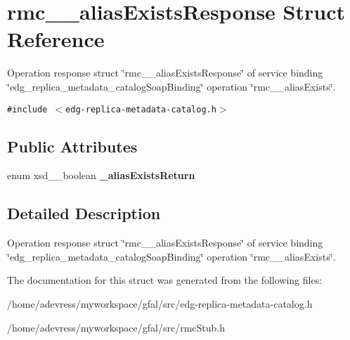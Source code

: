 \section{rmc\_\-\_\-alias\-Exists\-Response Struct Reference}
\label{structrmc____aliasExistsResponse}
Operation response struct \char`\"{}rmc\_\-\_\-alias\-Exists\-Response\char`\"{} of service binding \char`\"{}edg\_\-replica\_\-metadata\_\-catalog\-Soap\-Binding\char`\"{} operation \char`\"{}rmc\_\-\_\-alias\-Exists\char`\"{}.  


{\tt \#include $<$edg-replica-metadata-catalog.h$>$}

\subsection*{Public Attributes}
\begin{CompactItemize}
\item 
enum xsd\_\-\_\-boolean \textbf{\_\-alias\-Exists\-Return}\label{structrmc____aliasExistsResponse_06918aeebfd1263a8fa5eb0db5ab43c6}

\end{CompactItemize}


\subsection{Detailed Description}
Operation response struct \char`\"{}rmc\_\-\_\-alias\-Exists\-Response\char`\"{} of service binding \char`\"{}edg\_\-replica\_\-metadata\_\-catalog\-Soap\-Binding\char`\"{} operation \char`\"{}rmc\_\-\_\-alias\-Exists\char`\"{}. 



The documentation for this struct was generated from the following files:\begin{CompactItemize}
\item 
/home/adevress/myworkspace/gfal/src/edg-replica-metadata-catalog.h\item 
/home/adevress/myworkspace/gfal/src/rmc\-Stub.h\end{CompactItemize}
